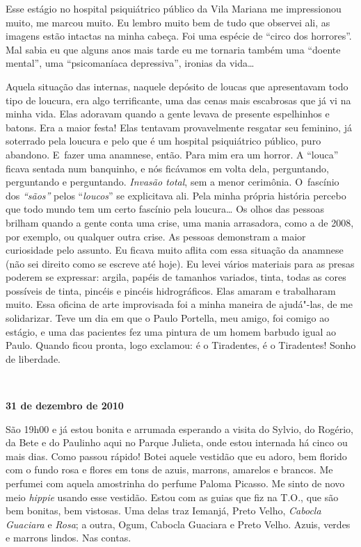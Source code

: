 Esse estágio no hospital psiquiátrico público da Vila Mariana me
impressionou muito, me marcou muito. Eu lembro muito bem de tudo que
observei ali, as imagens estão intactas na minha cabeça. Foi uma espécie
de ``circo dos horrores''. Mal sabia eu que alguns anos mais tarde eu me
tornaria também uma ``doente mental'', uma ``psicomaníaca depressiva'',
ironias da vida…

Aquela situação das internas, naquele depósito de loucas que
apresentavam todo tipo de loucura, era algo terrificante, uma das cenas
mais escabrosas que já vi na minha vida. Elas adoravam quando a gente
levava de presente espelhinhos e batons. Era a maior festa! Elas
tentavam provavelmente resgatar seu feminino, já soterrado pela loucura
e pelo que é um hospital psiquiátrico público, puro abandono. E~fazer
uma anamnese, então. Para mim era um horror. A ``louca'' ficava
sentada num banquinho, e nós ficávamos em volta dela, perguntando,
perguntando e perguntando. \emph{Invasão total}, sem a menor cerimônia.
O~fascínio dos \emph{``sãos''} pelos ``\emph{loucos}'' se explicitava
ali. Pela minha própria história percebo que todo mundo tem um certo
fascínio pela loucura… Os olhos das pessoas brilham quando a
gente conta uma crise, uma mania arrasadora, como a de 2008, por
exemplo, ou qualquer outra crise. As pessoas demonstram a maior
curiosidade pelo assunto. Eu ficava muito aflita com essa situação da
anamnese (não sei direito como se escreve até hoje). Eu levei
vários materiais para as presas poderem se expressar: argila, papéis de
tamanhos variados, tinta, todas as cores possíveis de tinta, pincéis e
pincéis hidrográficos. Elas amaram e trabalharam muito. Essa oficina de
arte improvisada foi a minha maneira de ajudá"-las, de me solidarizar.
Teve um dia em que o Paulo Portella, meu amigo, foi comigo ao estágio, e
uma das pacientes fez uma pintura de um homem barbudo igual ao Paulo.
Quando ficou pronta, logo exclamou: é o Tiradentes, é o Tiradentes!
Sonho de liberdade.

\begin{center}\asterisc{}​\end{center}


\begin{flushright}\textbf{31 de dezembro de 2010}\end{flushright}


São 19h00 e já estou bonita e arrumada esperando a visita do Sylvio, do
Rogério, da Bete e do Paulinho aqui no Parque Julieta, onde estou
internada há cinco ou mais dias. Como passou rápido! Botei aquele
vestidão que eu adoro, bem florido com o fundo rosa e flores em tons de
azuis, marrons, amarelos e brancos. Me perfumei com aquela amostrinha do
perfume Paloma Picasso. Me sinto de novo meio \emph{hippie} usando esse
vestidão. Estou com as guias que fiz na T.O., que são bem bonitas, bem
vistosas. Uma delas traz Iemanjá, Preto Velho, \emph{Cabocla Guaciara} e
\emph{Rosa}; a outra, Ogum, Cabocla Guaciara e Preto Velho. Azuis,
verdes e marrons lindos. Nas contas.

